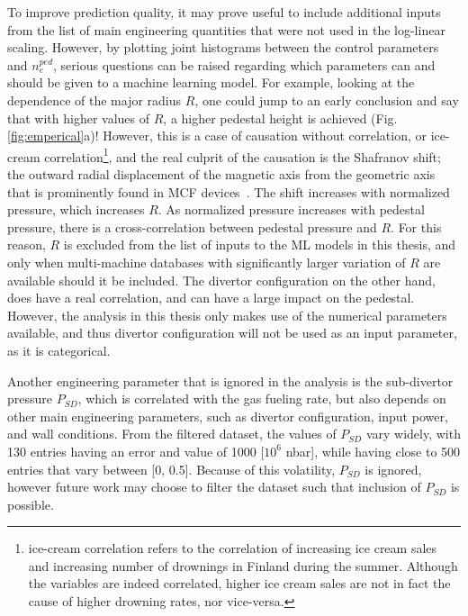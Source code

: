 \documentclass[a4paper, twoside, final, 12pt]{article}
\begin{document}
To improve prediction quality, it may prove useful to include additional inputs from the list of main engineering quantities that were not used in the log-linear scaling.
However, by plotting joint histograms between the control parameters and $n_e^{ped}$, serious questions can be raised regarding which parameters can and should be given to a machine learning model.
For example, looking at the dependence of the major radius $R$, one could jump to an early conclusion and say that with higher values of $R$, a higher pedestal height is achieved (Fig. \ref{fig:emperical}a)!
However, this is a case of causation without correlation, or ice-cream correlation\footnote{ice-cream correlation refers to the correlation of increasing ice cream sales and increasing number of drownings in Finland during the summer. Although the variables are indeed correlated, higher ice cream sales are not in fact the cause of higher drowning rates, nor vice-versa.}, and the real culprit of the causation is the Shafranov shift; the outward radial displacement of the magnetic axis from the geometric axis that is prominently found in MCF devices~\cite{shafranov_equilibrium_1963, freidberg_plasma_2007}. The shift increases with normalized pressure, which increases $R$. As normalized pressure increases with pedestal pressure, there is a cross-correlation between pedestal pressure and $R$. For this reason, $R$ is excluded from the list of inputs to the ML models in this thesis, and only when multi-machine databases with significantly larger variation of $R$ are available should it be included.
The divertor configuration on the other hand, does have a real correlation, and can have a large impact on the pedestal. However, the analysis in this thesis only makes use of the numerical parameters available, and thus divertor configuration will not be used as an input parameter, as it is categorical.  

Another engineering parameter that is ignored in the analysis is the sub-divertor pressure $P_{SD}$, which is correlated with the gas fueling rate, but also depends on other main engineering parameters, such as divertor configuration, input power, and wall conditions.
From the filtered dataset, the values of $P_{SD}$ vary widely, with 130 entries having an error and value of 1000 [$10^6$ nbar], while having close to 500 entries that vary between [0, 0.5].
Because of this volatility, $P_{SD}$ is ignored, however future work may choose to filter the dataset such that inclusion of $P_{SD}$ is possible.
\end{document}
